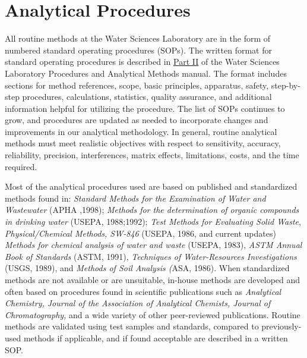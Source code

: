  

\section{Analytical Procedures}
All routine methods at the Water Sciences Laboratory are in the form of 
numbered standard operating procedures (SOPs). The written format for 
standard operating procedures is described in \hyperlink{Analytical}{Part II} of 
the Water Sciences Laboratory Procedures and Analytical Methods manual. 
The format includes sections for method references, scope, basic 
principles, apparatus, safety, step-by-step procedures, calculations, 
statistics, quality assurance, and additional information helpful for 
utilizing the procedure. The list of SOPs continues to grow, and 
procedures are updated as needed to incorporate changes and improvements 
in our analytical methodology. In general, routine analytical methods 
must meet realistic objectives with respect to sensitivity, accuracy, 
reliability, precision, interferences, matrix effects, limitations, 
costs, and the time required. 

Most of the analytical procedures used are based on published and 
standardized methods found in: \textit{Standard Methods for the 
Examination of Water and Wastewater }(APHA ,1998); \textit{Methods for 
the determination of organic compounds in drinking water }(USEPA, 
1988;1992); \textit{Test Methods for Evaluating Solid Waste}, 
\textit{Physical/Chemical Methods, SW-846} (USEPA, 1986, and current 
updates)\textit{ Methods for chemical analysis of water and waste} 
(USEPA, 1983), \textit{ASTM Annual Book of Standards }(ASTM, 1991), 
\textit{Techniques of Water-Resources Investigations }(USGS, 1989), 
and \textit{Methods of Soil Analysis (}ASA, 1986). When standardized 
methods are not available or are unsuitable, in-house methods are 
developed and often based on procedures found in scientific publications 
such as \textit{Analytical Chemistry, Journal of the Association of 
Analytical Chemists, Journal of Chromatography,} and a wide variety of 
other peer-reviewed publications. Routine methods are validated using 
test samples and standards, compared to previously-used methods if 
applicable, and if found acceptable are described in a written SOP. 

